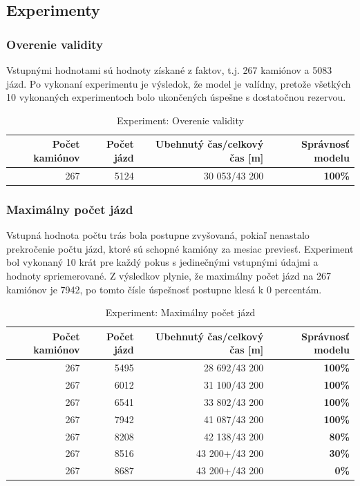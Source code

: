 \documentclass[a4paper, 11pt]{article}
\begin{document}
    \subsection{Experimenty}
    \subsubsection{Overenie validity}
    Vstupnými hodnotami sú hodnoty získané z faktov, t.j. 267 kamiónov
    a 5083 jázd. Po vykonaní experimentu je výsledok, že model je valídny,
    pretože všetkých 10 vykonaných experimentoch bolo ukončených úspešne
    s dostatočnou rezervou.
    \begin{table}[ht]
		\centering
		\begin{tabular}{|r|r|r|r|}
			\hline
			Počet kamiónov & Počet jázd & Ubehnutý čas/celkový čas [m] & \textbf{Správnosť modelu} \\ \hline
			267 & 5124 & 30 053/43 200 &\textbf{100\%} \\ \hline
		\end{tabular}

		\caption{Experiment: Overenie validity}
		\label{table:1}
	\end{table}

    \subsubsection{Maximálny počet jázd}
    Vstupná hodnota počtu trás bola postupne zvyšovaná, pokiaľ nenastalo prekročenie
    počtu jázd, ktoré sú schopné kamióny za mesiac previesť. Experiment bol vykonaný
    10 krát pre každý pokus s jedinečnými vstupnými údajmi a hodnoty spriemerované.\newline
    Z výsledkov plynie, že maximálny počet jázd na 267 kamiónov je 7942, po tomto čísle
    úspešnosť postupne klesá k 0 percentám.
    \begin{table}[ht]
		\centering
		\begin{tabular}{|r|r|r|r|}
			\hline
			Počet kamiónov & Počet jázd & Ubehnutý čas/celkový čas [m] & \textbf{Správnosť modelu} \\ \hline
			267 & 5495 & 28 692/43 200 &\textbf{100\%} \\ \hline
            267 & 6012 & 31 100/43 200 &\textbf{100\%} \\ \hline
            267 & 6541 & 33 802/43 200 &\textbf{100\%} \\ \hline
            267 & 7942 & 41 087/43 200 &\textbf{100\%} \\ \hline
            267 & 8208 & 42 138/43 200 &\textbf{80\%} \\ \hline
            267 & 8516 & 43 200+/43 200 &\textbf{30\%} \\ \hline
            267 & 8687 & 43 200+/43 200 &\textbf{0\%} \\ \hline
		\end{tabular}

		\caption{Experiment: Maximálny počet jázd}
		\label{table:2}
	\end{table}
\end{document}
